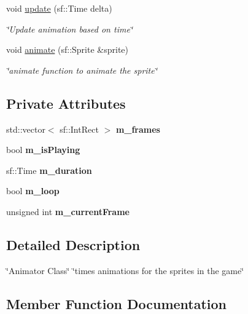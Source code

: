 \begin{DoxyCompactItemize}
void \hyperlink{classAnimator_a619d6e7f88fcf2788a58ccf19068c73b}{update} (sf\+::\+Time delta)
\begin{DoxyCompactList}\small\item\em \char`\"{}\+Update animation based on time\char`\"{} \end{DoxyCompactList}\item 
void \hyperlink{classAnimator_a04281600d159dbc1556d3856b69cef74}{animate} (sf\+::\+Sprite \&sprite)
\begin{DoxyCompactList}\small\item\em \char`\"{}animate function to animate the sprite\char`\"{} \end{DoxyCompactList}\end{DoxyCompactItemize}
\subsection*{Private Attributes}
\begin{DoxyCompactItemize}
\item 
\mbox{\label{classAnimator_a37a6d9c81a255c1adcebad88a62a62d7}} 
std\+::vector$<$ sf\+::\+Int\+Rect $>$ {\bfseries m\+\_\+frames}
\item 
\mbox{\label{classAnimator_ad11d7d42a6082393b2a5c4fcc1f9fea0}} 
bool {\bfseries m\+\_\+is\+Playing}
\item 
\mbox{\label{classAnimator_a3082eea50040a6522de6ebc2a90caab4}} 
sf\+::\+Time {\bfseries m\+\_\+duration}
\item 
\mbox{\label{classAnimator_ae7c08fe8255ca307e92eeda429d569f2}} 
bool {\bfseries m\+\_\+loop}
\item 
\mbox{\label{classAnimator_a33f754f51e88d2b7275c4baeb32ab3cb}} 
unsigned int {\bfseries m\+\_\+current\+Frame}
\end{DoxyCompactItemize}


\subsection{Detailed Description}
\char`\"{}\+Animator Class\char`\"{}  \char`\"{}times animations for the sprites in the game\char`\"{} 

\subsection{Member Function Documentation}
\mbox{\label{classAnimator_a5acf71c2ee34281b7acd09af5d7a2b77}} 
